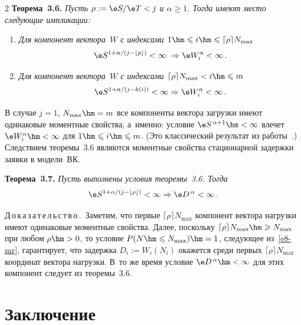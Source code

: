 \begin{multicols}{2}
\noindent
\textbf{Теорема~3.6.}
\textit{Пусть $\rho:=\e S/\e T<j$ и   $\alpha\geqslant 1$.
Тогда имеют место
    следующие импликации:}
\begin{enumerate}[1.]
\item \textit{Для компонент вектора~$W$ с индексами 
$1\hm\leqslant i\hm\leqslant \lceil\rho\rceil N_{\max}$}
        \begin{equation*}
        \e S^{1+{\alpha}/({j-\lfloor\rho\rfloor})}<\infty\  \Rightarrow
        \e W_i ^\alpha<\infty\,.
        \end{equation*}
\item \textit{Для компонент вектора~$W$ с индексами $\lceil\rho\rceil N_{\max}<i\hm\leqslant m$}
        \begin{equation*}
        \e S^{1+{\alpha}/({j-k(i)})}<\infty  \Rightarrow   \e W_i^\alpha<\infty\,.
        \end{equation*}
\end{enumerate}

\smallskip

В случае $j=1$, $N_{\max}\hm=m$ все компоненты  вектора загрузки имеют
одинаковые моментные свойства, а~именно: условие  $\e
S^{\,\alpha+1}\hm<\infty$ влечет $\e W_i^\alpha\hm<\infty$ для $1\hm\leqslant i\hm\leqslant m$. 
(Это классический результат из работы~\cite{Kiefer1}.) Следствием теоремы~3.6 являются
моментные свойства стационарной  задержки заявки в модели~ВК.


\medskip

\noindent
\textbf{Теорема~3.7.} \textit{Пусть выполнены условия теоремы~3.6.
    Тогда}
    \begin{equation*}
    \e S^{1+{\alpha}/({j-\lfloor \rho\rfloor})}<\infty\Rightarrow \e D^{\,\alpha}<\infty\,.
    \end{equation*}

\medskip


\noindent
Д\,о\,к\,а\,з\,а\,т\,е\,л\,ь\,с\,т\,в\,о\,.\
 Заметим, что  первые
$\lceil\rho\rceil N_{\max}${} компонент  вектора нагрузки имеют
одинаковые моментные свойства. Далее, поскольку $\lceil\rho\rceil
N_{\max}\hm\geqslant N_{\max}$ при любом $\rho\hm>0$, то условие
$P(N\hm\leqslant N_{\max})\hm=1$, следующее из~\eqref{e8-mr}, гарантирует, что
задержка $D_{i}:=W_{i}(N_{i})$ окажется среди первых
$\lceil\rho\rceil N_{\max}$ координат вектора нагрузки. В~то же
время условие $\e D^{\,\alpha}\hm<\infty$  для этих компонент  следует
из теоремы~3.6.


\section{Заключение}\label{sec4}


\end{multicols}

